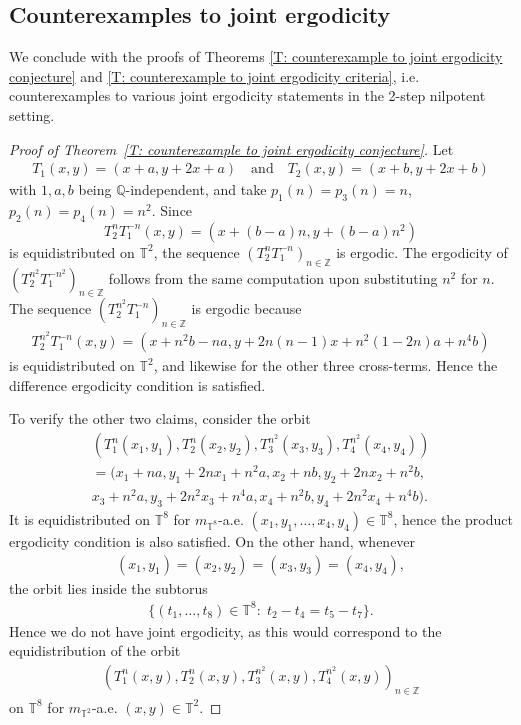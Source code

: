 \documentclass[11pt]{amsart}
\theoremstyle{definition}
\newcommand{\T}{{\mathbb T}}
\newcommand{\Z}{{\mathbb Z}}
\newcommand{\1}{{\mathbf{1}}}
\begin{document}
\subsection{Counterexamples to joint ergodicity}\label{SS: counterexamples}
We conclude with the proofs of Theorems \ref{T: counterexample to joint ergodicity conjecture} and \ref{T: counterexample to joint ergodicity criteria}, i.e. counterexamples to various joint ergodicity statements in the 2-step nilpotent setting. 
\begin{proof}[Proof of Theorem~\ref{T: counterexample to joint ergodicity conjecture}]
    Let
    \begin{align*}
        T_{1}(x,y)=(x+a,y+2x+a)\quad\textrm{and}\quad T_{2}(x,y)=(x+b,y+2x+b)
    \end{align*}
     with $1,a,b$ being $\mathbb{Q}$-independent, and take $p_1(n) = p_3(n) = n$, $p_2(n) = p_4(n) = n^2$. 
    Since
    $$T_{2}^{n}T_{1}^{-n}(x,y)=(x+(b-a)n,y+(b-a)n^2)$$
    is equidistributed on $\T^2$,
     the sequence $(T_{2}^{n}T_{1}^{-n})_{n\in\Z}$ is ergodic. The ergodicity of $(T_{2}^{n^{2}}T_{1}^{-n^{2}})_{n\in\Z}$ follows from the same computation upon substituting $n^2$ for $n$. 
     The sequence $(T_{2}^{n^{2}}T_{1}^{-n})_{n\in\Z}$ is ergodic because 
     \begin{align*}
         T_2^{n^2}T_1^{-n}(x,y) = (x + n^2 b - na, y + 2n(n-1)x + n^2(1-2n)a + n^4 b)
     \end{align*}
     is equidistributed on $\T^2$,
     and likewise for the other three cross-terms. Hence the difference ergodicity condition is satisfied. 

     To verify the other two claims, consider the orbit
     \begin{multline*}%
         (T_1^n(x_1,y_1), T_2^n(x_2,y_2), T_3^{n^2}(x_3,y_3), T_4^{n^2}(x_4,y_4))\\ = (x_{1}+na,y_{1}+2nx_{1}+n^{2}a,
          x_{2}+nb,y_{2}+2nx_{2}+n^{2}b,\\ x_{3}+n^{2}a,y_{3}+2n^{2}x_{3}+n^{4}a, x_{4}+n^{2}b,y_{4}+2n^{2}x_{4}+n^{4}b).
     \end{multline*}
     It is equidistributed on $\T^8$ for $m_{\T^8}$-a.e. $(x_1, y_1, \ldots, x_4, y_4)\in \T^8$, hence the product ergodicity condition is also satisfied.
    On the other hand, whenever
    \begin{align*}
     (x_1,y_1) = (x_2,y_2) = (x_3,y_3) = (x_4,y_4),
    \end{align*}
    the orbit lies inside the subtorus
    \begin{align*}
        \{(t_1, \ldots, t_8)\in\T^8\colon\; t_{2}-t_{4}=t_{5}-t_{7}\}.
    \end{align*}
    Hence we do not have joint ergodicity, as this would correspond to the equidistribution of the orbit
    \begin{align}\label{E: counterexample orbit 2}
        (T_1^n(x,y), T_2^n(x,y), T_3^{n^2}(x,y), T_4^{n^2}(x,y))_{n\in\Z}
    \end{align}
    on $\T^8$ for $m_{\T^2}$-a.e. $(x,y)\in\T^2.$
\end{proof}
\end{document}

